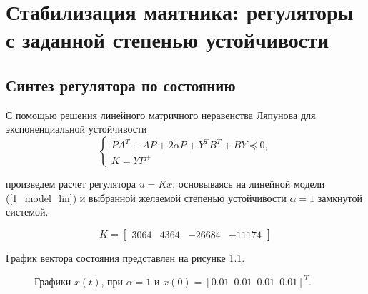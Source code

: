 \chapter{Стабилизация маятника: регуляторы с заданной степенью устойчивости}
\label{ch:chap4}


\section{Синтез регулятора по состоянию}


С помощью решения линейного матричного неравенства Ляпунова для экспоненциальной устойчивости 
\begin{equation}
    \begin{cases}
        PA^T+AP+2 \alpha P + Y^T B^T+BY \preceq 0,\\
        K = Y P^+
    \end{cases}
\end{equation}

произведем расчет регулятора $u=Kx$, основываясь на линейной модели (\ref{1_model_lin}) и выбранной желаемой степенью устойчивости $\alpha =1 $ замкнутой системой.

\begin{equation}
    K = \begin{bmatrix}
        3064 & 4364 & -26684 & -11174
    \end{bmatrix}
\end{equation}

График вектора состояния представлен на рисунке \ref{4_1_1}.

\begin{figure}[!h]
\caption{Графики $x(t)$, при $\alpha = 1$ и $x(0) = [0.01\, \, \,  0.01\, \, \, 0.01\, \, \, 0.01]^T$.}
\label{4_1_1}
\end{figure}






